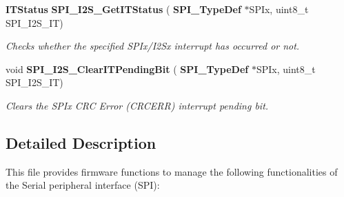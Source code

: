 \begin{DoxyCompactItemize}
\textbf{ I\+T\+Status} \textbf{ S\+P\+I\+\_\+\+I2\+S\+\_\+\+Get\+I\+T\+Status} (\textbf{ S\+P\+I\+\_\+\+Type\+Def} $\ast$S\+P\+Ix, uint8\+\_\+t S\+P\+I\+\_\+\+I2\+S\+\_\+\+IT)
\begin{DoxyCompactList}\small\item\em Checks whether the specified S\+P\+Ix/\+I2\+Sx interrupt has occurred or not. \end{DoxyCompactList}\item 
void \textbf{ S\+P\+I\+\_\+\+I2\+S\+\_\+\+Clear\+I\+T\+Pending\+Bit} (\textbf{ S\+P\+I\+\_\+\+Type\+Def} $\ast$S\+P\+Ix, uint8\+\_\+t S\+P\+I\+\_\+\+I2\+S\+\_\+\+IT)
\begin{DoxyCompactList}\small\item\em Clears the S\+P\+Ix C\+RC Error (C\+R\+C\+E\+RR) interrupt pending bit. \end{DoxyCompactList}\end{DoxyCompactItemize}


\subsection{Detailed Description}
This file provides firmware functions to manage the following functionalities of the Serial peripheral interface (S\+PI)\+: 

